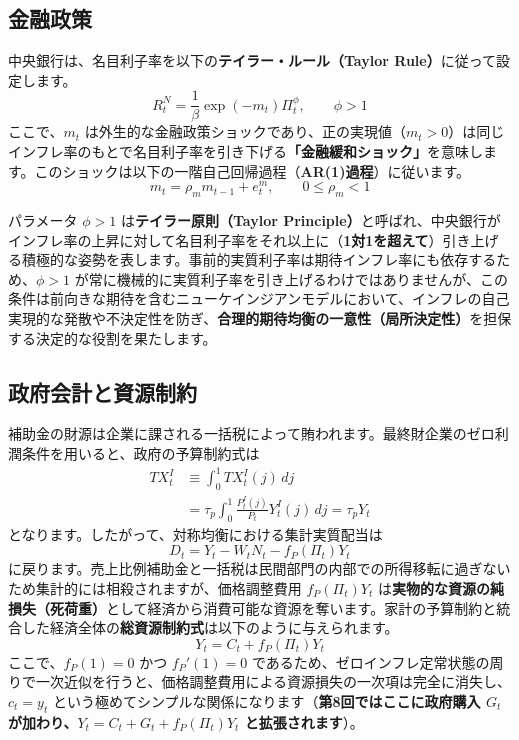 \documentclass[
  japanese,
  lualatex,
  ja=standard,
  12pt,
  a4paper]{ltjsarticle}
\begin{document}
\subsection{金融政策}\label{ux91d1ux878dux653fux7b56}

中央銀行は、名目利子率を以下の\textbf{テイラー・ルール（Taylor
Rule）}に従って設定します。 \[
R_t^N=\frac{1}{\beta}\exp(-m_t)\Pi_t^\phi,
\qquad
\phi>1
\] ここで、\(m_t\)
は外生的な金融政策ショックであり、正の実現値（\(m_t>0\)）は同じインフレ率のもとで名目利子率を引き下げる\textbf{「金融緩和ショック」}を意味します。このショックは以下の一階自己回帰過程（\textbf{AR(1)過程}）に従います。
\[
m_t=\rho_m m_{t-1}+e_t^m,
\qquad
0\leq\rho_m<1
\]

パラメータ \(\phi>1\) は\textbf{テイラー原則（Taylor
Principle）}と呼ばれ、中央銀行がインフレ率の上昇に対して名目利子率をそれ以上に（\textbf{1対1を超えて}）引き上げる積極的な姿勢を表します。事前的実質利子率は期待インフレ率にも依存するため、\(\phi>1\)
が常に機械的に実質利子率を引き上げるわけではありませんが、この条件は前向きな期待を含むニューケインジアンモデルにおいて、インフレの自己実現的な発散や不決定性を防ぎ、\textbf{合理的期待均衡の一意性（局所決定性）}を担保する決定的な役割を果たします。

\subsection{政府会計と資源制約}\label{ux653fux5e9cux4f1aux8a08ux3068ux8cc7ux6e90ux5236ux7d04}

補助金の財源は企業に課される一括税によって賄われます。最終財企業のゼロ利潤条件を用いると、政府の予算制約式は
\[
\begin{aligned}
TX_t^I
&\equiv\int_0^1TX_t^I(j)\,dj\\
&=\tau_p\int_0^1
\frac{P_t^I(j)}{P_t}Y_t^I(j)\,dj
=\tau_pY_t
\end{aligned}
\] となります。したがって、対称均衡における集計実質配当は \[
D_t
=Y_t-W_tN_t-f_P(\Pi_t)Y_t
\]
に戻ります。売上比例補助金と一括税は民間部門の内部での所得移転に過ぎないため集計的には相殺されますが、価格調整費用
\(f_P(\Pi_t)Y_t\)
は\textbf{実物的な資源の純損失（死荷重）}として経済から消費可能な資源を奪います。家計の予算制約と統合した経済全体の\textbf{総資源制約式}は以下のように与えられます。
\[
Y_t=C_t+f_P(\Pi_t)Y_t
\] ここで、\(f_P(1)=0\) かつ \(f_P'(1)=0\)
であるため、ゼロインフレ定常状態の周りで一次近似を行うと、価格調整費用による資源損失の一次項は完全に消失し、\(c_t=y_t\)
という極めてシンプルな関係になります（\textbf{第8回ではここに政府購入
\(G_t\) が加わり、\(Y_t=C_t+G_t+f_P(\Pi_t)Y_t\) と拡張されます}）。
\end{document}
